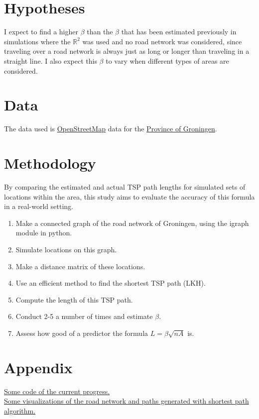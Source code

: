 \documentclass[a4paper,11pt]{article}
\newcommand{\1}[1]{\,I_{#1}} %
\begin{document}
\section{Hypotheses}
I expect to find a higher $\beta$ than the $\beta$ that has been estimated previously in simulations where the $\mathbb{R}^2$ was used and no road network was considered, since traveling over a road network is always just as long or longer than traveling in a straight line. I also expect this $\beta$ to vary when different types of areas are considered. 
\section{Data}
The data used is \href{https://www.openstreetmap.org/#map=12/53.2184/6.5702}{OpenStreetMap} data for the \href{https://download.geofabrik.de/europe/netherlands/groningen.html}{Province of Groningen}.
\section{Methodology}
By comparing the estimated and actual TSP path lengths for simulated sets of locations within the area, this study aims to evaluate the accuracy of this formula in a real-world setting.
\begin{enumerate}
    \item Make a connected graph of the road network of Groningen, using the igraph module in python.
    \item Simulate locations on this graph.
    \item Make a distance matrix of these locations.
    \item Use an efficient method to find the shortest TSP path (LKH).
    \item Compute the length of this TSP path.
    \item Conduct 2-5 a number of times and estimate $\beta$.
    \item Assess how good of a predictor the formula $L=\beta\sqrt{nA}$ is.
\end{enumerate}


\section{Appendix}
\href{https://github.com/koen1859/Scriptie}{Some code of the current progress.}\\
\href{https://koenstevens.nl/?page_id=182}{Some visualizations of the road network and paths generated with shortest path algorithm.}
\end{document}
